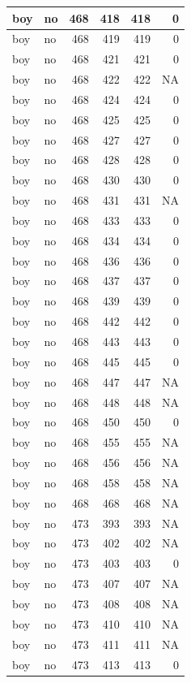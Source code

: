 \documentclass[man]{apa6}
\begin{document}
\begin{tabular}{l|l|r|r|r|r}
\hline
boy & no & 468 & 418 & 418 & 0\\
\hline
boy & no & 468 & 419 & 419 & 0\\
\hline
boy & no & 468 & 421 & 421 & 0\\
\hline
boy & no & 468 & 422 & 422 & NA\\
\hline
boy & no & 468 & 424 & 424 & 0\\
\hline
boy & no & 468 & 425 & 425 & 0\\
\hline
boy & no & 468 & 427 & 427 & 0\\
\hline
boy & no & 468 & 428 & 428 & 0\\
\hline
boy & no & 468 & 430 & 430 & 0\\
\hline
boy & no & 468 & 431 & 431 & NA\\
\hline
boy & no & 468 & 433 & 433 & 0\\
\hline
boy & no & 468 & 434 & 434 & 0\\
\hline
boy & no & 468 & 436 & 436 & 0\\
\hline
boy & no & 468 & 437 & 437 & 0\\
\hline
boy & no & 468 & 439 & 439 & 0\\
\hline
boy & no & 468 & 442 & 442 & 0\\
\hline
boy & no & 468 & 443 & 443 & 0\\
\hline
boy & no & 468 & 445 & 445 & 0\\
\hline
boy & no & 468 & 447 & 447 & NA\\
\hline
boy & no & 468 & 448 & 448 & NA\\
\hline
boy & no & 468 & 450 & 450 & 0\\
\hline
boy & no & 468 & 455 & 455 & NA\\
\hline
boy & no & 468 & 456 & 456 & NA\\
\hline
boy & no & 468 & 458 & 458 & NA\\
\hline
boy & no & 468 & 468 & 468 & NA\\
\hline
boy & no & 473 & 393 & 393 & NA\\
\hline
boy & no & 473 & 402 & 402 & NA\\
\hline
boy & no & 473 & 403 & 403 & 0\\
\hline
boy & no & 473 & 407 & 407 & NA\\
\hline
boy & no & 473 & 408 & 408 & NA\\
\hline
boy & no & 473 & 410 & 410 & NA\\
\hline
boy & no & 473 & 411 & 411 & NA\\
\hline
boy & no & 473 & 413 & 413 & 0\\

\end{tabular}
\end{document}

